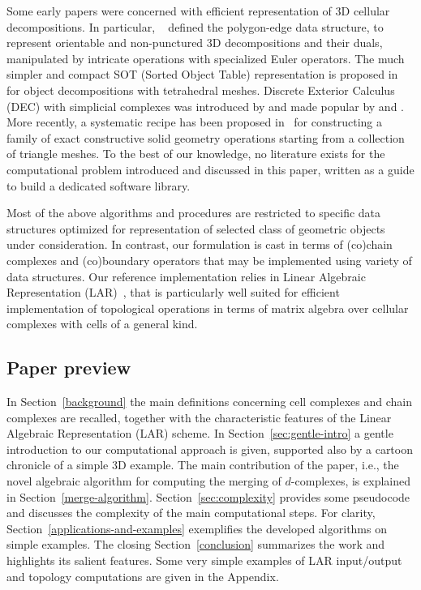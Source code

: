 Some early papers were concerned with efficient representation of 3D cellular decompositions. 
In particular, ~\cite{Dobkin:1987:PMT:41958.41967} defined the polygon-edge data structure, to represent orientable and non-punctured 3D decompositions and their duals, manipulated by intricate operations with specialized Euler operators.
The much simpler and compact  SOT (Sorted Object Table) representation is proposed in~\cite{Gurung:2009:SCR:1629255.1629266} for object decompositions with tetrahedral meshes. 
{Discrete Exterior Calculus (DEC) with simplicial complexes was introduced by \cite{Hirani:2003:DEC:959640} and made popular by \cite{Desbrun:2006:DDF:1185657.1185665} and \cite{Elcott:2006:BYO:1185657.1185666}.}
More recently,  a systematic recipe   has been proposed  in~\cite{Zhou:2016:MAS:2897824.2925901} for constructing a family of exact constructive solid geometry operations starting from a collection of triangle meshes.
To the best of our knowledge, no literature exists for the computational problem introduced and discussed in this paper, written as a guide {to build} a dedicated software library.

{Most of the above algorithms and procedures are restricted  to  specific data structures optimized for representation of selected class of geometric objects under consideration.   In contrast, our formulation is cast in terms {of} (co)chain complexes and (co)boundary operators that may be implemented using variety of data structures.  Our reference implementation relies in Linear Algebraic Representation (LAR)~\cite{Dicarlo:2014:TNL:2543138.2543294}, that is particularly well suited for efficient implementation of topological operations in terms {of} matrix algebra over cellular complexes with cells of a general kind.   }

\subsection{Paper preview}

In Section~\ref{background} the main definitions concerning cell complexes and chain complexes are recalled, together with the characteristic features of the Linear Algebraic Representation (LAR) scheme.
In Section~\ref{sec:gentle-intro} a gentle introduction to our computational approach is given, supported also by a cartoon chronicle of a simple 3D example.
The main {contribution} of the paper, i.e., the novel algebraic algorithm for computing the merging of $d$-complexes, is {explained} in Section~\ref{merge-algorithm}. Section~\ref{sec:complexity} provides some pseudocode and discusses the complexity of the main computational steps.
{For clarity, Section~\ref{applications-and-examples} exemplifies the developed algorithms on  simple examples.}
The closing Section~\ref{conclusion} {summarizes} the work and highlights its salient features.
Some very simple examples of LAR input/output and topology computations are given in the {Appendix}.


